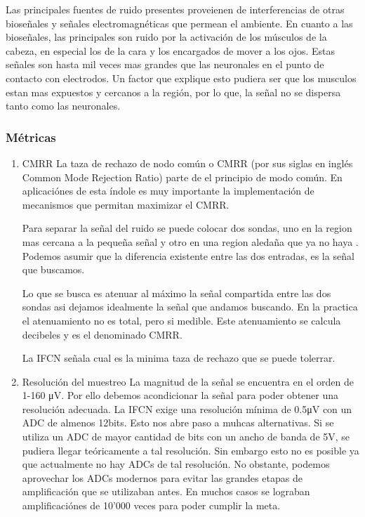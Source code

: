 Las principales fuentes de ruido presentes proveienen de interferencias de otras bioseñales y señales electromagnéticas que permean el ambiente. En cuanto a las bioseñales, las principales son ruido por la activación de los músculos de la cabeza, en especial los de la cara y los encargados de mover a los ojos. Estas señales son hasta mil veces mas grandes que las neuronales en el punto de contacto con electrodos. Un factor que explique esto pudiera ser que los musculos estan mas expuestos y cercanos a la región, por lo que, la señal no se dispersa tanto como las neuronales.

\subsubsection{Métricas}
\label{sec:orgc2ad869}
\begin{enumerate}
\item CMRR
\label{sec:orgd1c0765}
La taza de rechazo de nodo común o CMRR (por sus siglas en inglés Common Mode Rejection Ratio) parte de el principio de modo común.
En aplicaciónes de esta índole es muy importante la implementación de mecanismos que permitan maximizar el CMRR.

Para separar la señal del ruido se puede colocar dos sondas, uno en la region mas cercana a la pequeña señal y otro en una region aledaña que ya no haya . Podemos asumir que la diferencia existente entre las dos entradas, es la señal que buscamos.

Lo que se busca es atenuar al máximo la señal compartida entre las dos sondas asi dejamos idealmente la señal que andamos buscando. En la practica el atenuamiento no es total, pero si medible. Este atenuamiento se calcula decibeles y es el denominado CMRR.

La IFCN señala cual es la minima taza de rechazo que se puede tolerrar.

\item Resolución del muestreo
\label{sec:org7a49515}
La magnitud de la señal se encuentra en el orden de 1-160 μV. Por ello debemos acondicionar la señal para poder obtener una resolución adecuada. La IFCN exige una resolución mínima de 0.5μV con un ADC de almenos 12bits. Esto nos abre paso a muhcas alternativas. Si se utiliza un ADC de mayor cantidad de bits con un ancho de banda de 5V, se pudiera llegar teóricamente a tal resolución. Sin embargo esto no es posible ya que actualmente no hay ADCs de tal resolución. No obstante, podemos aprovechar los ADCs modernos para evitar las grandes etapas de amplificación que se utilizaban antes. En muchos casos se lograban amplificaciónes de 10’000 veces para poder cumplir la meta.


\end{enumerate}
